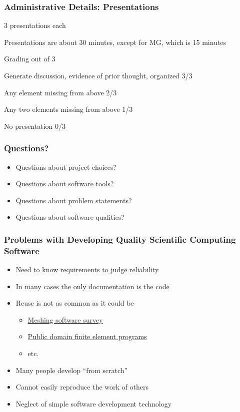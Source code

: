 \documentclass[t,12pt,numbers,fleqn]{beamer}
\begin{document}

\begin{frame}
\frametitle{Administrative Details: Presentations}

\bi
\item 3 presentations each
\item Presentations are about 30 minutes, except for MG, which is 15 minutes
\item Grading out of 3
\bi
\item Generate discussion, evidence of prior thought, organized 3/3
\item Any element missing from above 2/3
\item Any two elements missing from above 1/3
\item No presentation 0/3
\ei
\ei

\end{frame}


\begin{frame}
\frametitle{Questions?}
\begin{itemize}
\item Questions about project choices?
\item Questions about software tools?
\item Questions about problem statements?
\item Questions about software qualities?
\end{itemize}
\end{frame}


\begin{frame}

\frametitle{Problems with Developing Quality Scientific Computing Software}

\begin{itemize}

\item Need to know requirements to judge reliability
\item In many cases the only documentation is the code
\item Reuse is not as common as it could be
\begin{itemize}
\item \href{http://www.andrew.cmu.edu/user/sowen/softsurv.html}{\alert{Meshing software survey}}
\item \href{http://www.engr.usask.ca/~macphed/finite/fe_resources/node137.html}{\alert{Public domain finite element
programs}}
\item etc.
\end{itemize}
\item Many people develop ``from scratch''
\item Cannot easily reproduce the work of others
\item Neglect of simple software development technology~\cite{Wilson2006} 

\end{itemize}

\end{frame}
\end{document}
